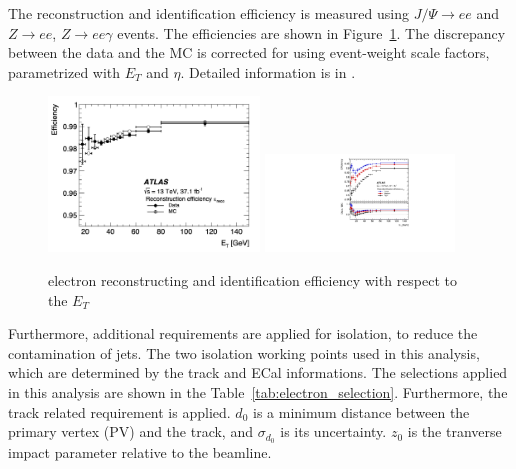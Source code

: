 The reconstruction and identification efficiency is measured using  $J/\Psi \rightarrow ee$ and $Z\rightarrow ee$, $Z\rightarrow ee\gamma$ events. The efficiencies are shown in Figure~\ref{fig:recoElectron}. The discrepancy between the data and the MC is corrected for using event-weight scale factors, parametrized with $E_T$ and $\eta$. Detailed information is in \cite{PERF-2017-01}.
\begin{figure}[tbp]
\begin{center}
 \includegraphics[width=0.50\textwidth,keepaspectratio]{figures/Reconstruction/recoElectron}
 \includegraphics[width=0.45\textwidth,keepaspectratio]{figures/Reconstruction/idElectron}
\caption{
electron reconstructing and identification efficiency with respect to the $E_T$
}
\label{fig:recoElectron}
\end{center}
\end{figure}
Furthermore, additional requirements are applied for isolation, to reduce the contamination of jets. The two isolation working points used in this analysis, which are determined by the track and ECal informations. The selections applied in this analysis are shown in the Table~\ref{tab:electron_selection}.
Furthermore, the track related requirement is applied. $d_0$ is a minimum distance between the primary vertex (PV) and the track, and $\sigma_{d_0}$ is its uncertainty. $z_0$ is the tranverse impact parameter relative to the beamline.
